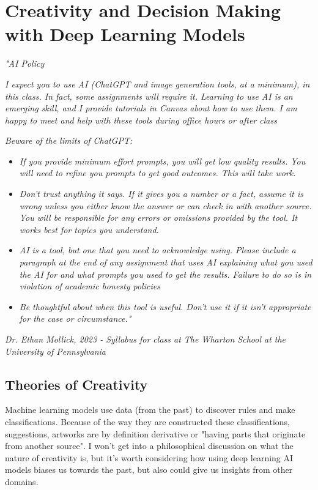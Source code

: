 \setchapterpreamble[u]{\margintoc}
\chapter{Creativity and Decision Making with Deep Learning Models}

\textit{"AI Policy}

\textit{I expect you to use AI (ChatGPT and image generation tools, at a minimum), in this class. In fact, some assignments will require it. Learning to use AI is an emerging skill, and I provide tutorials in Canvas about how to use them. I am happy to meet and help with these tools during office hours or after class}

\textit{Beware of the limits of ChatGPT:}

\begin{itemize}
	\item\textit{If you provide minimum effort prompts, you will get low quality results. You will need to refine you prompts to get good outcomes. This will take work.}
	\item\textit{Don't trust anything it says. If it gives you a number or a fact, assume it is wrong unless you either know the answer or can check in with another source. You will be responsible for any errors or omissions provided by the tool. It works best for topics you understand.}
	\item\textit{AI is a tool, but one that you need to acknowledge using. Please include a paragraph at the end of any assignment that uses AI explaining what you used the AI for and what prompts you used to get the results. Failure to do so is in violation of academic honesty policies}
	\item\textit{Be thoughtful about when this tool is useful. Don't use it if it isn't appropriate for the case or circumstance."}
\end{itemize}

\textit{Dr. Ethan Mollick, 2023 - Syllabus for class at The Wharton School at the University of Pennsylvania}


\section{Theories of Creativity}

Machine learning models use data (from the past) to discover rules and make classifications. Because of the way they are constructed these classifications, suggestions, artworks are by definition derivative or "having parts that originate from another source". I won't get into a philosophical discussion on what the nature of creativity is, but it's worth considering how using deep learning AI models biases us towards the past, but also could give us insights from other domains. 

